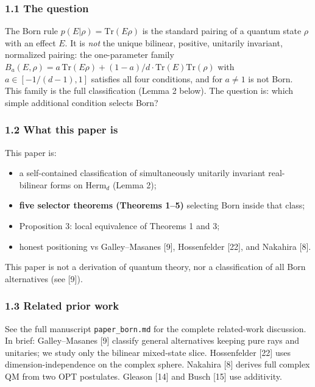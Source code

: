 \documentclass[
]{article}
\providecommand{\tightlist}{%
  \setlength{\itemsep}{0pt}\setlength{\parskip}{0pt}}
\begin{document}
\subsubsection{1.1 The question}\label{the-question}

The Born rule \(p(E|\rho)=\mathrm{Tr}(E\rho)\) is the standard pairing
of a quantum state \(\rho\) with an effect \(E\). It is \emph{not} the
unique bilinear, positive, unitarily invariant, normalized pairing: the
one-parameter family
\(B_a(E,\rho)=a\,\mathrm{Tr}(E\rho)+(1-a)/d\cdot\mathrm{Tr}(E)\mathrm{Tr}(\rho)\)
with \(a\in[-1/(d-1),1]\) satisfies all four conditions, and for
\(a\neq 1\) is not Born. This family is the full classification (Lemma 2
below). The question is: which simple additional condition selects Born?

\subsubsection{1.2 What this paper is}\label{what-this-paper-is}

This paper is:

\begin{itemize}
\tightlist
\item
  a self-contained classification of simultaneously unitarily invariant
  real-bilinear forms on \(\mathrm{Herm}_d\) (Lemma 2);
\item
  \textbf{five selector theorems (Theorems 1--5)} selecting Born inside
  that class;
\item
  Proposition 3: local equivalence of Theorems 1 and 3;
\item
  honest positioning vs Galley--Masanes {[}9{]}, Hossenfelder {[}22{]},
  and Nakahira {[}8{]}.
\end{itemize}

This paper is not a derivation of quantum theory, nor a classification
of all Born alternatives (see {[}9{]}).

\subsubsection{1.3 Related prior work}\label{related-prior-work}

See the full manuscript \texttt{paper\_born.md} for the complete
related-work discussion. In brief: Galley--Masanes {[}9{]} classify
general alternatives keeping pure rays and unitaries; we study only the
bilinear mixed-state slice. Hossenfelder {[}22{]} uses
dimension-independence on the complex sphere. Nakahira {[}8{]} derives
full complex QM from two OPT postulates. Gleason {[}14{]} and Busch
{[}15{]} use additivity.
\end{document}
